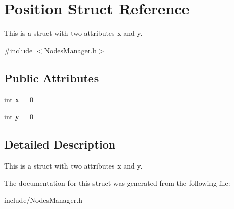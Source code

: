 \hypertarget{structPosition}{}\section{Position Struct Reference}
\label{structPosition}


This is a struct with two attributes x and y.  




{\ttfamily \#include $<$Nodes\+Manager.\+h$>$}

\subsection*{Public Attributes}
\begin{DoxyCompactItemize}
\item 
int {\bfseries x} = 0\hypertarget{structPosition_aeda152ffeee17ae5be9c02327b2408d8}{}\label{structPosition_aeda152ffeee17ae5be9c02327b2408d8}

\item 
int {\bfseries y} = 0\hypertarget{structPosition_a3c08e9213d4726b21caba3073192c4a3}{}\label{structPosition_a3c08e9213d4726b21caba3073192c4a3}

\end{DoxyCompactItemize}


\subsection{Detailed Description}
This is a struct with two attributes x and y. 

The documentation for this struct was generated from the following file\+:\begin{DoxyCompactItemize}
\item 
include/Nodes\+Manager.\+h\end{DoxyCompactItemize}
